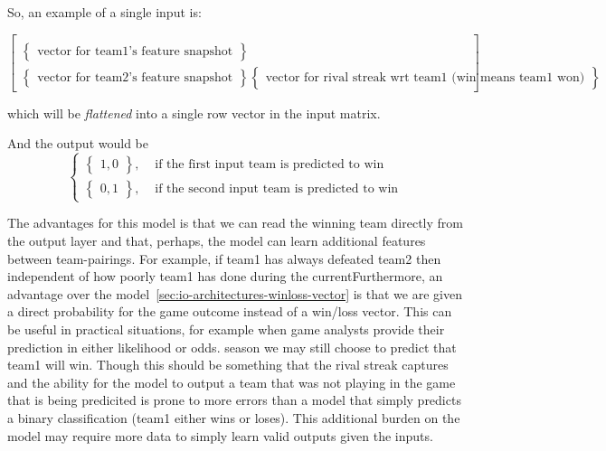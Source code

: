 \documentclass{article} %
\begin{document}
So, an example of a single input is:

\[
\begin{bmatrix}
  \\
  \begin{Bmatrix}
    \text{vector for team1's feature snapshot}
  \end{Bmatrix}
  \\
  \begin{Bmatrix}
    \text{vector for team2's feature snapshot}
  \end{Bmatrix}
  \begin{Bmatrix}
    \text{vector for rival streak wrt team1 (win means team1 won)}
  \end{Bmatrix}
\end{bmatrix}
\]

which will be \textit{flattened} into a single row vector in the input matrix.

And the output would be
\[
\begin{cases}
  \begin{Bmatrix} 1, 0 \end{Bmatrix}, & \mbox{ if the first input team is predicted to win}\\
  \begin{Bmatrix} 0, 1 \end{Bmatrix}, & \mbox{ if the second input team is predicted to win}
\end{cases}
\]


The advantages for this model is that we can read the winning team directly from the output layer and that, perhaps, the model can learn additional features between team-pairings.  For example, if team1 has always defeated team2 then independent of how poorly team1 has done during the currentFurthermore, an advantage over the model~\ref{sec:io-architectures-winloss-vector} is that we are given a direct probability for the game outcome instead of a win/loss vector.  This can be useful in practical situations, for example when game analysts provide their prediction in either likelihood or odds. season we may still choose to predict that team1 will win.  Though this should be something that the rival streak captures and the ability for the model to output a team that was not playing in the game that is being predicited is prone to more errors than a model that simply predicts a binary classification (team1 either wins or loses).  This additional burden on the model may require more data to simply learn valid outputs given the inputs.
\end{document}
